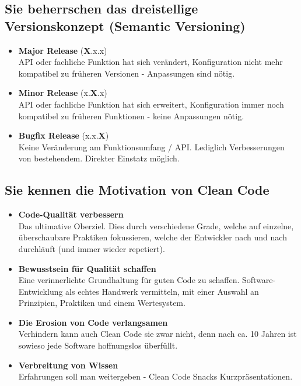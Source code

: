 \subsection{Sie beherrschen das dreistellige Versionskonzept (Semantic Versioning)}
\begin{itemize}
  \item \textbf{Major Release} (\textbf{X}.x.x)\\
  API oder fachliche Funktion hat sich verändert, Konfiguration nicht mehr kompatibel zu früheren Versionen - Anpassungen sind nötig.
  \item \textbf{Minor Release} (x.\textbf{X}.x)\\
  API oder fachliche Funktion hat sich erweitert, Konfiguration immer noch kompatibel zu früheren Funktionen - keine Anpassungen nötig.
  \item \textbf{Bugfix Release} (x.x.\textbf{X})\\
  Keine Veränderung am Funktionsumfang / API. Lediglich Verbesserungen von bestehendem. Direkter Einstatz möglich.
  
\end{itemize}

\subsection{Sie kennen die Motivation von Clean Code}
\begin{itemize}
  \item \textbf{Code-Qualität verbessern} \\
  Das ultimative Oberziel. Dies durch verschiedene Grade, welche auf einzelne, überschaubare Praktiken fokussieren, welche der Entwickler nach und nach durchläuft (und immer wieder repetiert).
  \item \textbf{Bewusstsein für Qualität schaffen} \\
  Eine verinnerlichte Grundhaltung für guten Code zu schaffen. Software-Entwicklung als echtes Handwerk vermitteln, mit einer Auswahl an Prinzipien, Praktiken und einem Wertesystem.
  \item \textbf{Die Erosion von Code verlangsamen} \\
   Verhindern kann auch Clean Code sie zwar nicht, denn nach ca. 10 Jahren ist sowieso jede Software hoffnungslos überfüllt. 
   \item \textbf{Verbreitung von Wissen} \\
   Erfahrungen soll man weitergeben - Clean Code Snacks Kurzpräsentationen.
\end{itemize}

